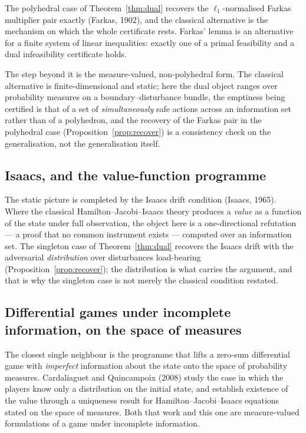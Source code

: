 \documentclass[10pt,twocolumn]{article}
\theoremstyle{definition}
\begin{document}
The polyhedral case of Theorem~\ref{thm:dual} recovers the $\ell_{1}$-normalised Farkas
multiplier pair exactly (Farkas, 1902), and the classical alternative is the mechanism on
which the whole certificate rests. Farkas' lemma is an alternative for a finite system of
linear inequalities: exactly one of a primal feasibility and a dual infeasibility certificate
holds.

The step beyond it is the measure-valued, non-polyhedral form. The classical alternative is
finite-dimensional and static; here the dual object ranges over probability measures on a
boundary--disturbance bundle, the emptiness being certified is that of a set of
\emph{simultaneously} safe actions across an information set rather than of a polyhedron, and
the recovery of the Farkas pair in the polyhedral case
(Proposition~\ref{prop:recover}) is a consistency check on the generalisation, not the
generalisation itself.

\subsection{Isaacs, and the value-function programme}

The static picture is completed by the Isaacs drift condition (Isaacs, 1965). Where the
classical Hamilton--Jacobi--Isaacs theory produces a \emph{value} as a function of the state
under full observation, the object here is a one-directional refutation --- a proof that no
common instrument exists --- computed over an information set. The singleton case of
Theorem~\ref{thm:dual} recovers the Isaacs drift with the adversarial \emph{distribution}
over disturbances load-bearing (Proposition~\ref{prop:recover}); the distribution is what
carries the argument, and that is why the singleton case is not merely the classical
condition restated.

\subsection{Differential games under incomplete information, on the space of measures}

The closest single neighbour is the programme that lifts a zero-sum differential game with
\emph{imperfect} information about the state onto the space of probability measures.
Cardaliaguet and Quincampoix (2008) study the case in which the players know only a
distribution on the initial state, and establish existence of the value through a uniqueness
result for Hamilton--Jacobi--Isaacs equations stated on the space of measures. Both that
work and this one are measure-valued formulations of a game under incomplete information.
\end{document}
